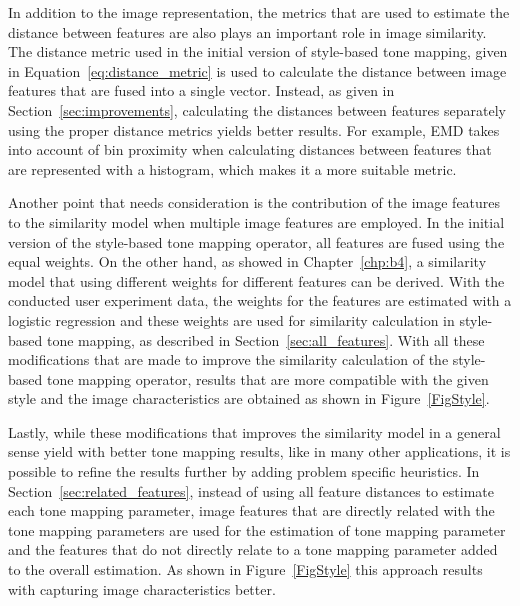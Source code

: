 In addition to the image representation, the metrics that are used to estimate the distance between features are also plays an important role in image similarity. The distance metric used in the initial version of style-based tone mapping, given in Equation~\ref{eq:distance_metric} is used to calculate the distance between image features that are fused into a single vector. Instead, as given in Section~\ref{sec:improvements}, calculating the distances between features separately using the proper distance metrics yields better results. For example, EMD takes into account of bin proximity when calculating distances between features that are represented with a histogram, which makes it a more suitable metric.

Another point that needs consideration is the contribution of the image features to the similarity model when multiple image features are employed. In the initial version of the style-based tone mapping operator, all features are fused using the equal weights. On the other hand, as showed in Chapter~\ref{chp:b4}, a similarity model that using different weights for different features can be derived. With the conducted user experiment data, the weights for the features are estimated with a logistic regression and these weights are used for similarity calculation in style-based tone mapping, as described in Section~\ref{sec:all_features}. With all these modifications that are made to improve the similarity calculation of the style-based tone mapping operator, results that are more compatible with the given style and the image characteristics are obtained as shown in Figure~\ref{FigStyle}. 

Lastly, while these modifications that improves the similarity model in a general sense yield with better tone mapping results, like in many other applications, it is possible to refine the results further by adding problem specific heuristics. In Section~\ref{sec:related_features}, instead of using all feature distances to estimate each tone mapping parameter, image features that are directly related with the tone mapping parameters are used for the estimation of tone mapping parameter and the features that do not directly relate to a tone mapping parameter added to the overall estimation. As shown in Figure~\ref{FigStyle} this approach results with capturing image characteristics better.  